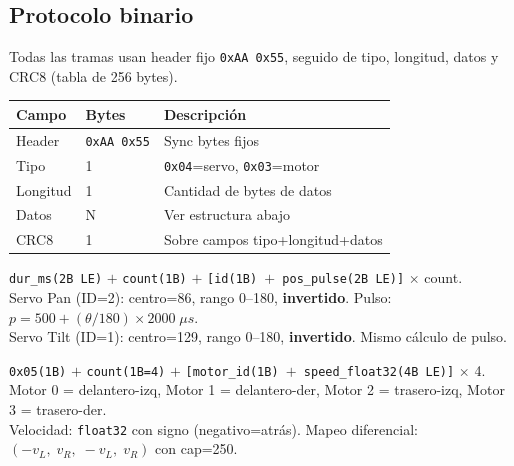 \documentclass[11pt,a4paper]{article}
\begin{document}
\subsection{Protocolo binario}

Todas las tramas usan header fijo \texttt{0xAA 0x55}, seguido de tipo, longitud, datos y CRC8 (tabla de 256 bytes).

\begin{center}\small
\begin{tabular}{llp{8cm}}
\toprule
\textbf{Campo} & \textbf{Bytes} & \textbf{Descripci\'{o}n} \\
\midrule
Header & \texttt{0xAA 0x55} & Sync bytes fijos \\
Tipo & 1 & \texttt{0x04}=servo, \texttt{0x03}=motor \\
Longitud & 1 & Cantidad de bytes de datos \\
Datos & N & Ver estructura abajo \\
CRC8 & 1 & Sobre campos tipo+longitud+datos \\
\bottomrule
\end{tabular}
\end{center}

\begin{infobox}[title={Estructura de trama Servo (tipo \texttt{0x04})}]
\small
\texttt{dur\_ms(2B LE)} $+$ \texttt{count(1B)} $+$ \texttt{[id(1B) $+$ pos\_pulse(2B LE)]} $\times$ count. \\[3pt]
Servo Pan (ID=2): centro=86\textdegree, rango 0--180\textdegree, \textbf{invertido}. Pulso: $p = 500 + (\theta/180)\times 2000\;\mu s$. \\
Servo Tilt (ID=1): centro=129\textdegree, rango 0--180\textdegree, \textbf{invertido}. Mismo c\'{a}lculo de pulso.
\end{infobox}

\begin{infobox}[title={Estructura de trama Motor (tipo \texttt{0x03})}]
\small
\texttt{0x05(1B)} $+$ \texttt{count(1B=4)} $+$ \texttt{[motor\_id(1B) $+$ speed\_float32(4B LE)]} $\times$ 4. \\[3pt]
Motor 0 = delantero-izq, Motor 1 = delantero-der, Motor 2 = trasero-izq, Motor 3 = trasero-der. \\
Velocidad: \texttt{float32} con signo (negativo=atr\'{a}s). Mapeo diferencial: $(-v_L,\;v_R,\;-v_L,\;v_R)$ con cap=250.
\end{infobox}

\end{document}
